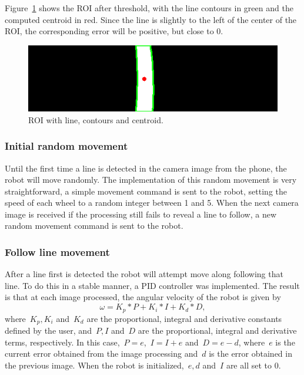 \documentclass[10pt,conference,compsoc]{IEEEtran}
\begin{document}
Figure~\ref{fig:centroid} shows the ROI after threshold, with the line contours in green and the computed centroid in red. Since the line is slightly to the left of the center of the ROI, the corresponding error will be positive, but close to 0.

\begin{figure}[thpb]
\centering
\includegraphics[scale=0.4]{img/centroid.png}
\caption{ROI with line, contours and centroid.}
\label{fig:centroid}
\end{figure}

\subsubsection{Initial random movement}

Until the first time a line is detected in the camera image from the phone, the robot will move randomly. The implementation of this random movement is very straightforward, a simple movement command is sent to the robot, setting the speed of each wheel to a random integer between 1 and 5. When the next camera image is received if the processing still fails to reveal a line to follow, a new random movement command is sent to the robot.

\subsubsection{Follow line movement}

After a line first is detected the robot will attempt move along following that line. To do this in a stable manner, a PID controller was implemented. The result is that at each image processed, the angular velocity of the robot is given by $$\omega = K_p * P + K_i * I + K_d * D,$$ where~$K_p, K_i$ and~$K_d$ are the proportional, integral and derivative constants defined by the user, and~$P, I$ and~$D$ are the proportional, integral and derivative terms, respectively. In this case,~$P = e$,~$I = I + e$ and~$D = e - d$, where~$e$ is the current error obtained from the image processing and~$d$ is the error obtained in the previous image. When the robot is initialized,~$e, d$ and~$I$ are all set to 0.
\end{document}

